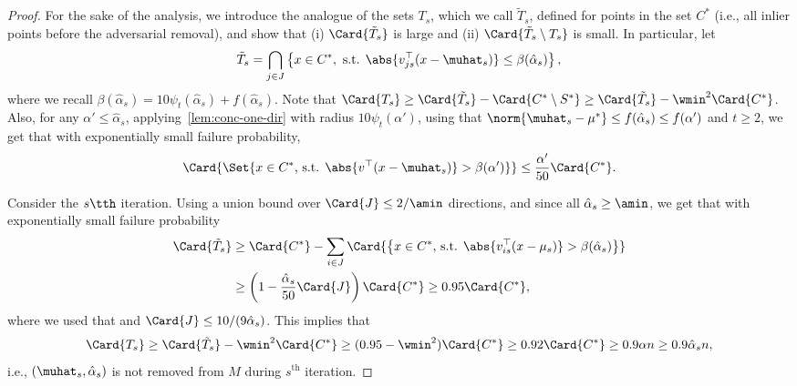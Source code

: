 \begin{proof}
For the sake of the analysis, we introduce the analogue of the sets \(T_s\), 
which we call \(\tilde T_s\), defined for points in the set \(C^{\ast}\) (i.e., all inlier points before the adversarial removal), and show that (i) \(\Card{\tilde T_s}\) is large 
and (ii) \(\Card{\tilde T_s \setminus T_s}\) is small.
In particular, let 
\[\tilde T_s =  \bigcap_{j \in J} \left\{x \in C^{\ast}, \text{ s.t. } \abs{v_{js}^{\top} (x - \muhat_s)} \leq \beta(\hat\alpha_s) \right\},\]
where we recall \(\beta(\hat\alpha_s) = 10 \psi_t(\hat\alpha_s) + f(\hat\alpha_s)\).
Note that \(\Card{T_s} \geq \Card{\tilde T_s} - \Card{C^{\ast} \setminus S^{\ast}} 
            \geq \Card{\tilde T_s} - \wmin^2\Card{C^{\ast}}\).
Also, for any \(\alpha' \leq \hat \alpha_s\), applying~\cref{lem:conc-one-dir} with radius \(10 \psi_t(\alpha')\), 
using that \(\norm{\muhat_s - \mu^{\ast}} \leq f(\hat\alpha_s) \leq f(\alpha')\) and \(t \geq 2\),
we get that with exponentially small failure probability,
\begin{equation}
    \label{eq:card_ub}
    \Card{\Set{x \in C^{\ast} \text{, s.t. } \abs{v^{\top}(x - \muhat_s)} > \beta(\alpha')}} \leq \frac{\alpha'}{50}\Card{C^{\ast}}.
\end{equation}

Consider the \(s\tth\) iteration.
Using a union bound over \(\Card{J} \leq 2 / \amin\) directions, and since all \(\hat \alpha_s \geq \amin\),
we get that with exponentially small failure probability
\begin{equation*}
    \begin{aligned}
    \Card{\tilde T_s} & \geq \Card{C^{\ast}} - \sum_{i \in J} \Card{\left\{x \in C^{\ast} \text{, s.t. } \abs{v_{is}^{\top} (x - \mu_s)} > \beta(\hat\alpha_s) \right\}} \\
    &\geq \left(1 - \frac{\hat\alpha_s}{50}\Card{J}\right) \Card{C^{\ast}} \geq 0.95 \Card{C^{\ast}},
    \end{aligned}
\end{equation*}
where we used that and \(\Card{J} \leq 10 / (9\hat\alpha_s)\).
This implies that 
\begin{equation*}
    \Card{T_s} \geq \Card{\tilde T_s} - \wmin^2 \Card{C^{\ast}} \geq (0.95 - \wmin^2) \Card{C^{\ast}} \geq 0.92\Card{C^{\ast}} \geq 0.9 \alpha n \geq 0.9\hat \alpha_s n,
\end{equation*}
i.e., \((\muhat_s, \hat\alpha_s)\) is not removed from \(M\) during \(s^{\mathrm{th}}\) iteration.



\end{proof}
